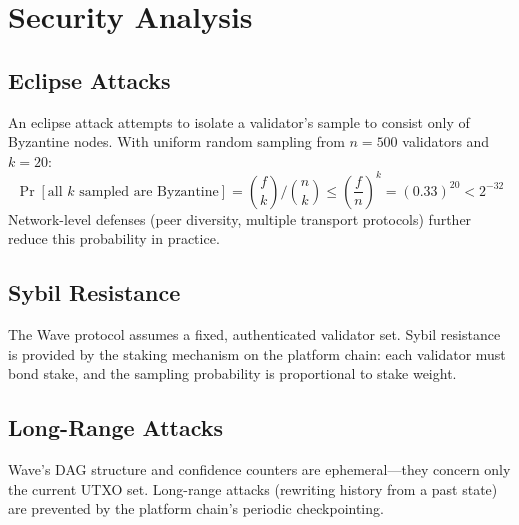 \section{Security Analysis}

\label{sec:security}

\subsection{Eclipse Attacks}

An eclipse attack attempts to isolate a validator's sample to consist only of Byzantine
nodes. With uniform random sampling from $n = 500$ validators and $k = 20$:
\[
\Pr[\text{all } k \text{ sampled are Byzantine}] = \binom{f}{k} / \binom{n}{k}
\leq \left(\frac{f}{n}\right)^k = (0.33)^{20} < 2^{-32}
\]
Network-level defenses (peer diversity, multiple transport protocols) further reduce this
probability in practice.

\subsection{Sybil Resistance}

The Wave protocol assumes a fixed, authenticated validator set. Sybil resistance is
provided by the staking mechanism on the platform chain: each validator must bond
stake, and the sampling probability is proportional to stake weight.

\subsection{Long-Range Attacks}

Wave's DAG structure and confidence counters are ephemeral---they concern only the
current UTXO set. Long-range attacks (rewriting history from a past state) are prevented
by the platform chain's periodic checkpointing.

